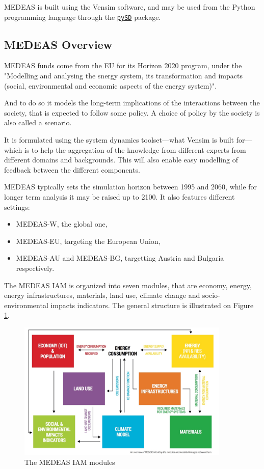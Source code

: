 MEDEAS is built using the Vensim software, and may be used from the Python programming language through the \href{https://pypi.org/project/pysd/}{\texttt{pySD}} package.

\subsection{MEDEAS Overview}

MEDEAS funds come from the EU for its Horizon 2020 program, under the "Modelling and analysing the snergy system, its transformation and impacts (social, environmental and economic aspects of the energy system)".

And to do so it models the long-term implications of the interactions between the society, that is expected to follow some policy. A choice of policy by the society is also called a scenario.

It is formulated using the system dynamics toolset---what Vensim is built for---which is to help the aggregation of the knowledge from different experts from different domains and backgrounds. This will also enable easy modelling of feedback between the different components.

MEDEAS typically sets the simulation horizon between 1995 and 2060, while for longer term analysis it may be raised up to 2100. It also features different settings:
\begin{itemize}
    \item MEDEAS-W, the global one,
    \item MEDEAS-EU, targeting the European Union,
    \item MEDEAS-AU and MEDEAS-BG, targetting Austria and Bulgaria respectively.
\end{itemize}

The MEDEAS IAM is organized into seven modules, that are economy, energy, energy infrastructures, materials, land use, climate change and socio-environmental impacts indicators. The general structure is illustrated on Figure \ref{fig:medeas-modules}.

\begin{figure}[h]
    \centering
    \includegraphics[width=0.9\textwidth]{resources/images/medeas.png}
    \caption{The MEDEAS IAM modules}
    \label{fig:medeas-modules}
\end{figure}

